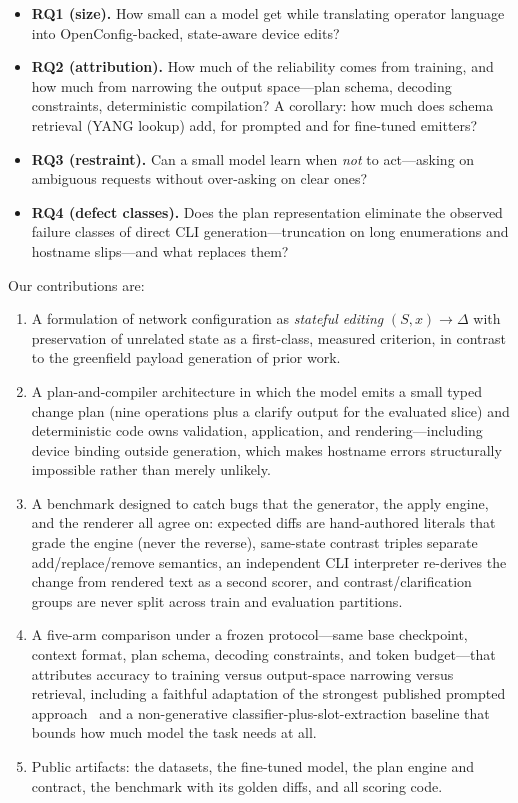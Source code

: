 \documentclass[conference]{IEEEtran}
\begin{document}
\begin{itemize}
\item \textbf{RQ1 (size).} How small can a model get while translating operator language into OpenConfig-backed, state-aware device edits?
\item \textbf{RQ2 (attribution).} How much of the reliability comes from training, and how much from narrowing the output space---plan schema, decoding constraints, deterministic compilation? A corollary: how much does schema retrieval (YANG lookup) add, for prompted and for fine-tuned emitters?
\item \textbf{RQ3 (restraint).} Can a small model learn when \emph{not} to act---asking on ambiguous requests without over-asking on clear ones?
\item \textbf{RQ4 (defect classes).} Does the plan representation eliminate the observed failure classes of direct CLI generation---truncation on long enumerations and hostname slips---and what replaces them?
\end{itemize}

Our contributions are:

\begin{enumerate}
\item A formulation of network configuration as \emph{stateful editing} $(S, x) \rightarrow \Delta$ with preservation of unrelated state as a first-class, measured criterion, in contrast to the greenfield payload generation of prior work.
\item A plan-and-compiler architecture in which the model emits a small typed change plan (nine operations plus a clarify output for the evaluated slice) and deterministic code owns validation, application, and rendering---including device binding outside generation, which makes hostname errors structurally impossible rather than merely unlikely.
\item A benchmark designed to catch bugs that the generator, the apply engine, and the renderer all agree on: expected diffs are hand-authored literals that grade the engine (never the reverse), same-state contrast triples separate add/replace/remove semantics, an independent CLI interpreter re-derives the change from rendered text as a second scorer, and contrast/clarification groups are never split across train and evaluation partitions.
\item A five-arm comparison under a frozen protocol---same base checkpoint, context format, plan schema, decoding constraints, and token budget---that attributes accuracy to training versus output-space narrowing versus retrieval, including a faithful adaptation of the strongest published prompted approach~\cite{hollosi2024netconf} and a non-generative classifier-plus-slot-extraction baseline that bounds how much model the task needs at all.
\item Public artifacts: the datasets, the fine-tuned model, the plan engine and contract, the benchmark with its golden diffs, and all scoring code.
\end{enumerate}
\end{document}

